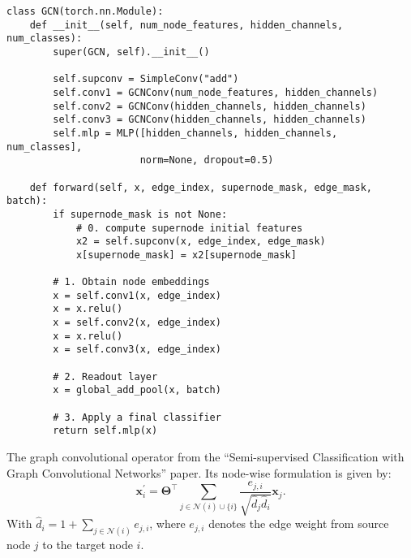 \documentclass{article}
\begin{document}
    \begin{code}
        \noindent
        \begin{lstlisting}
class GCN(torch.nn.Module):
    def __init__(self, num_node_features, hidden_channels, num_classes):
        super(GCN, self).__init__()

        self.supconv = SimpleConv("add")
        self.conv1 = GCNConv(num_node_features, hidden_channels)
        self.conv2 = GCNConv(hidden_channels, hidden_channels)
        self.conv3 = GCNConv(hidden_channels, hidden_channels)
        self.mlp = MLP([hidden_channels, hidden_channels, num_classes],
                       norm=None, dropout=0.5)

    def forward(self, x, edge_index, supernode_mask, edge_mask, batch):
        if supernode_mask is not None:
            # 0. compute supernode initial features
            x2 = self.supconv(x, edge_index, edge_mask)
            x[supernode_mask] = x2[supernode_mask]

        # 1. Obtain node embeddings
        x = self.conv1(x, edge_index)
        x = x.relu()
        x = self.conv2(x, edge_index)
        x = x.relu()
        x = self.conv3(x, edge_index)

        # 2. Readout layer
        x = global_add_pool(x, batch)

        # 3. Apply a final classifier
        return self.mlp(x)
        \end{lstlisting}
    \end{code}

    \begin{definition}
        The graph convolutional operator from the “Semi-supervised Classification with Graph Convolutional Networks” paper. Its node-wise formulation is given by:
        \[
            \mathbf{x}^{\prime}_i = \mathbf{\Theta}^{\top} \sum_{j \in \mathcal{N}(i) \cup \{ i \}} \frac{e_{j,i}}{\sqrt{\hat{d}_j \hat{d}_i}} \mathbf{x}_j
        .\]
        With \( \hat{d}_i = 1 + \sum_{j \in \mathcal{N}(i)} e_{j,i} \), where \( e_{j,i} \) denotes the edge weight from source node \( j \) to the target node \( i \).

    \end{definition}
\end{document}
